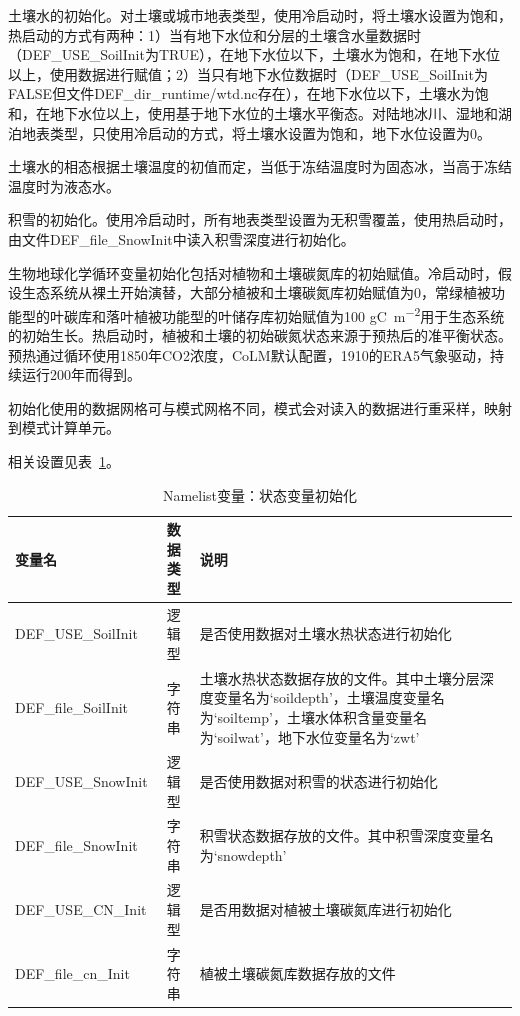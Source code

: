 \documentclass[a4paper,12pt,twoside]{article}
\begin{document}
土壤水的初始化。对土壤或城市地表类型，使用冷启动时，将土壤水设置为饱和，热启动的方式有两种：1）当有地下水位和分层的土壤含水量数据时（DEF\_USE\_SoilInit为TRUE），在地下水位以下，土壤水为饱和，在地下水位以上，使用数据进行赋值；2）当只有地下水位数据时（DEF\_USE\_SoilInit为FALSE但文件DEF\_dir\_runtime/wtd.nc存在），在地下水位以下，土壤水为饱和，在地下水位以上，使用基于地下水位的土壤水平衡态。对陆地冰川、湿地和湖泊地表类型，只使用冷启动的方式，将土壤水设置为饱和，地下水位设置为0。

土壤水的相态根据土壤温度的初值而定，当低于冻结温度时为固态冰，当高于冻结温度时为液态水。

积雪的初始化。使用冷启动时，所有地表类型设置为无积雪覆盖，使用热启动时，由文件DEF\_file\_SnowInit中读入积雪深度进行初始化。

生物地球化学循环变量初始化包括对植物和土壤碳氮库的初始赋值。冷启动时，假设生态系统从裸土开始演替，大部分植被和土壤碳氮库初始赋值为0，常绿植被功能型的叶碳库和落叶植被功能型的叶储存库初始赋值为100  \unit{gC.m^{-2}}用于生态系统的初始生长。热启动时，植被和土壤的初始碳氮状态来源于预热后的准平衡状态。预热通过循环使用1850年CO2浓度，CoLM默认配置，1910的ERA5气象驱动，持续运行200年而得到。

初始化使用的数据网格可与模式网格不同，模式会对读入的数据进行重采样，映射到模式计算单元。

相关设置见表~\ref{table_nl_ini}。

\begin{table}[!htbp] \small
\caption{Namelist变量：状态变量初始化}
\label{table_nl_ini}
\centering \renewcommand{\arraystretch}{1.5}
\begin{tabular}{lcp{}}
\toprule
\textbf{变量名} & \textbf{数据类型} & \textbf{说明} \\\midrule
DEF\_USE\_SoilInit & 逻辑型 & 是否使用数据对土壤水热状态进行初始化 \\
DEF\_file\_SoilInit & 字符串 & 土壤水热状态数据存放的文件。其中土壤分层深度变量名为`soildepth'，土壤温度变量名为`soiltemp'，土壤水体积含量变量名为`soilwat'，地下水位变量名为`zwt' \\
DEF\_USE\_SnowInit & 逻辑型 & 是否使用数据对积雪的状态进行初始化 \\
DEF\_file\_SnowInit & 字符串 & 积雪状态数据存放的文件。其中积雪深度变量名为`snowdepth' \\
DEF\_USE\_CN\_Init & 逻辑型 & 是否用数据对植被土壤碳氮库进行初始化 \\
DEF\_file\_cn\_Init & 字符串 & 植被土壤碳氮库数据存放的文件 \\
\bottomrule
\end{tabular} 
\end{table}
\end{document}
